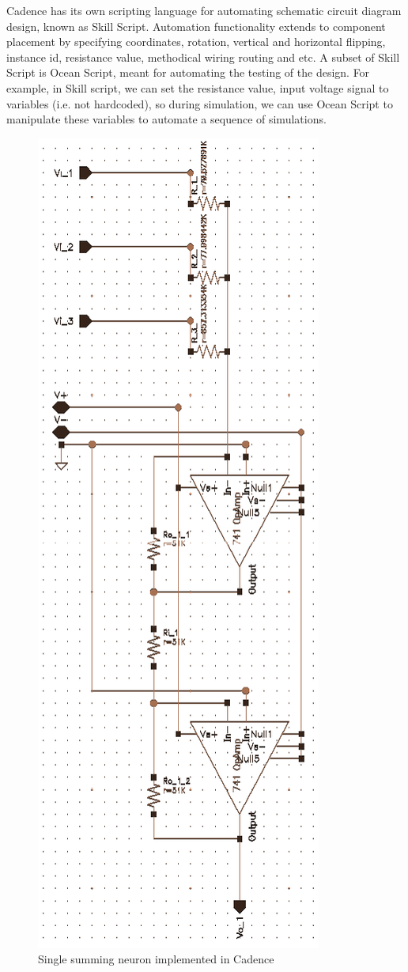Cadence has its own scripting language for automating schematic circuit diagram design, known as Skill Script. Automation functionality extends to component placement by specifying coordinates, rotation, vertical and horizontal flipping, instance id, resistance value, methodical wiring routing and etc. A subset of Skill Script is Ocean Script, meant for automating the testing of the design. For example, in Skill script, we can set the resistance value, input voltage signal to variables (i.e. not hardcoded), so during simulation, we can use Ocean Script to manipulate these variables to automate a sequence of simulations.
\begin{figure}[H]
	\centering
	\includegraphics[scale=0.5]{single.png}
	\caption{Single summing neuron implemented in Cadence}
	\label{fig:singleneuron}
\end{figure}
